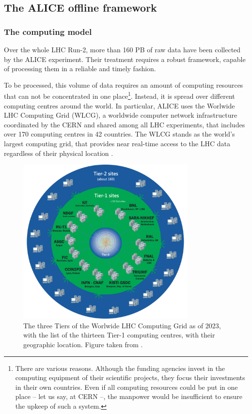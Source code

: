 \subsection{The ALICE offline framework}

\subsubsection{The computing model}

Over the whole LHC Run-2, more than 160 PB of raw data have been collected by the ALICE experiment. Their treatment requires a robust framework, capable of processing them in a reliable and timely fashion. 

To be processed, this volume of data requires an amount of computing resources that can not be concentrated in one place\footnote{There are various reasons. Although the funding agencies invest in the computing equipment of their scientific projects, they focus their investments in their own countries. Even if all computing resources could be put in one place -- let us say, at CERN --, the manpower would be insufficient to ensure the upkeep of such a system.}. Instead, it is spread over different computing centres around the world. In particular, ALICE uses the Worlwide LHC Computing Grid (WLCG), a worldwide computer network infrastructure coordinated by the CERN and shared among all LHC experiments, that includes over 170 computing centres in 42 countries. The WLCG stands as the world's largest computing grid, that provides near real-time access to the LHC data regardless of their physical location \cite{worldwidelhccomputinggridWorldwideLHCComputing}.

\begin{figure}[b]
	\centering
	\includegraphics[width=0.8\textwidth]{Figs/Chapter3/WLCG-Tiers-2021_v3_1.png}
	\caption{The three Tiers of the Worlwide LHC Computing Grid as of 2023, with the list of the thirteen Tier-1 computing centres, with their geographic location. Figure taken from \cite{worldwidelhccomputinggridWorldwideLHCComputing}.}
	\label{fig:WLCG}
\end{figure}


